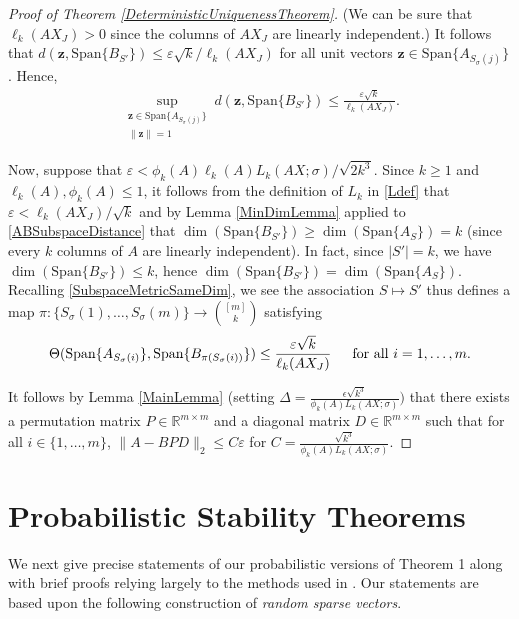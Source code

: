 \documentclass[journal, onecolumn]{IEEEtran}
\begin{document}
\begin{proof}[Proof of Theorem \ref{DeterministicUniquenessTheorem}]
(We can be sure that $\ell_k(AX_J) > 0$ since the columns of $AX_J$ are linearly independent.) It follows that $d(\mathbf{z}, \text{Span}\{B_{S'}\}) \leq \varepsilon\sqrt{k} / \ell_k(AX_J)$ for all unit vectors $\mathbf{z} \in \text{Span}\{A_{S_\sigma(j)}\}$. Hence,
\begin{align}\label{ABSubspaceDistance}
\sup_{ \substack{ \mathbf{z} \in \text{Span}\{A_{S_\sigma(j)}\} \\ \|\mathbf{z}\| = 1} } d(\mathbf{z}, \text{Span}\{B_{S'}\}) \leq \frac{\varepsilon\sqrt{k}}{\ell_k(AX_J)}.
\end{align}

Now, suppose that $\varepsilon <  \phi_k(A) \ell_{k}(A) L_k(AX;\sigma) / \sqrt{2k^3}$. Since $k \geq 1$ and $\ell_k(A), \phi_k(A) \leq 1$, it follows from the definition of $L_k$ in \eqref{Ldef} that $\varepsilon < \ell_k(AX_J)/\sqrt{k}$ and by Lemma \ref{MinDimLemma} applied to \eqref {ABSubspaceDistance} that $\dim(\text{Span}\{B_{S'}\}) \geq \dim(\text{Span}\{A_S\}) = k$ (since every $k$ columns of $A$ are linearly independent). In fact, since $|S'| = k$, we have $\dim(\text{Span}\{B_{S'}\}) \leq k$, hence $\dim(\text{Span}\{B_{S'}\}) = \dim(\text{Span}\{A_S\})$. Recalling \eqref{SubspaceMetricSameDim},  we see the association $S \mapsto S'$ thus defines a map $\pi: \{S_{\sigma}(1), \ldots, S_{\sigma}(m)\} \to {[m] \choose k}$ satisfying
\begin{align*}
\Theta(\text{Span}\{A_{S_\sigma(i)}\}, \text{Span}\{B_{\pi(S_\sigma(i))}\}) \leq \frac{\varepsilon\sqrt{k}}{\ell_k(AX_J)} \indent \text{for all } i = 1, \ldots, m.
\end{align*}

It follows by Lemma \ref{MainLemma} (setting $\Delta =  \frac{\epsilon \sqrt{k^3} }{ \phi_k(A) L_k(AX;\sigma) })$ that there exists a permutation matrix $P \in \mathbb{R}^{m \times m}$ and a diagonal matrix $D \in \mathbb{R}^{m \times m}$ such that for all $i \in \{1, \ldots, m\}$,
$\|A - BPD\|_2 \leq C\varepsilon$ for $C = \frac{\sqrt{k^3}}{ \phi_k(A)L_k(AX;\sigma) }$.
\end{proof}


\section{Probabilistic Stability Theorems}\label{PUT}

We next give precise statements of our probabilistic versions of Theorem 1 along with brief proofs relying largely to the methods used in \cite{HS11}. Our statements are based upon the following construction of \emph{random sparse vectors}.
\end{document}
